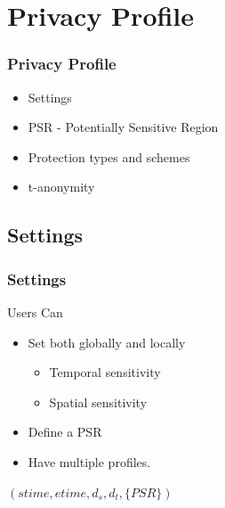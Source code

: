 \section{Privacy Profile}

\begin{frame}[red]
\frametitle{Privacy Profile}
\begin{itemize}
\item Settings
\item PSR - Potentially Sensitive Region
\item Protection types and schemes
\item t-anonymity
\end{itemize}
\end{frame}

\subsection{Settings} %

\begin{frame}[red] %
\frametitle{Settings}

Users Can
\begin{itemize}
	\item Set both globally and locally
	\begin{itemize}
		\item Temporal sensitivity
		\item Spatial sensitivity
	\end{itemize}
	\item Define a PSR
	\item Have multiple profiles.
\end{itemize}

\vspace{1em}
\begin{definition}
$\left(stime,etime,d_s, d_t,\{PSR \} \right)$
\end{definition}

\end{frame}



